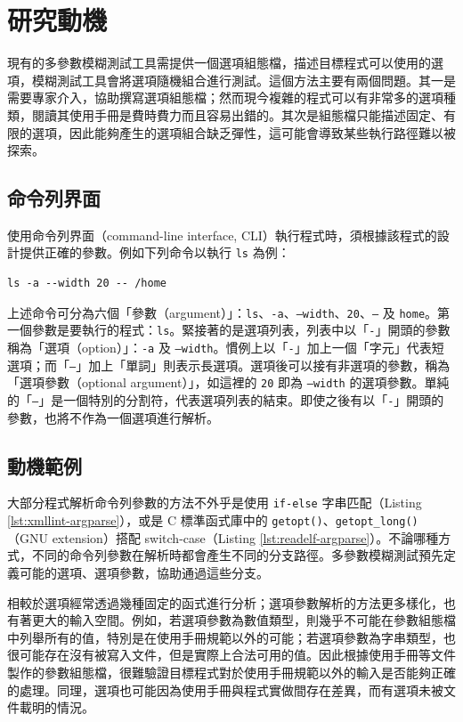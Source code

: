 \section{研究動機}

現有的多參數模糊測試工具需提供一個選項組態檔，描述目標程式可以使用的選項，模糊測試工具會將選項隨機組合進行測試。這個方法主要有兩個問題。其一是需要專家介入，協助撰寫選項組態檔；然而現今複雜的程式可以有非常多的選項種類，閱讀其使用手冊是費時費力而且容易出錯的。其次是組態檔只能描述固定、有限的選項，因此能夠產生的選項組合缺乏彈性，這可能會導致某些執行路徑難以被探索。

\subsection{命令列界面}

使用命令列界面（command-line interface, CLI）執行程式時，須根據該程式的設計提供正確的參數。例如下列命令以執行 \texttt{ls} 為例：

\begin{lstlisting}[numbers=none]
ls -a --width 20 -- /home
\end{lstlisting}

上述命令可分為六個「參數（argument）」：\texttt{ls}、\texttt{-a}、\texttt{--width}、\texttt{20}、\texttt{--} 及 \texttt{home}。第一個參數是要執行的程式：\texttt{ls}。緊接著的是選項列表，列表中以「\texttt{-}」開頭的參數稱為「選項（option）」：\texttt{-a} 及 \texttt{--width}。慣例上以「\texttt{-}」加上一個「字元」代表短選項；而「\texttt{--}」加上「單詞」則表示長選項。選項後可以接有非選項的參數，稱為「選項參數（optional argument）」，如這裡的 \texttt{20} 即為 \texttt{--width} 的選項參數。單純的「\texttt{--}」是一個特別的分割符，代表選項列表的結束。即使之後有以「\texttt{-}」開頭的參數，也將不作為一個選項進行解析。

\subsection{動機範例}

大部分程式解析命令列參數的方法不外乎是使用 \texttt{if-else} 字串匹配（Listing \ref{lst:xmllint-argparse}），或是 C 標準函式庫中的 \texttt{getopt()}、\texttt{getopt\_long()} （GNU extension）搭配 switch-case（Listing \ref{lst:readelf-argparse}）。不論哪種方式，不同的命令列參數在解析時都會產生不同的分支路徑。多參數模糊測試預先定義可能的選項、選項參數，協助通過這些分支。

相較於選項經常透過幾種固定的函式進行分析；選項參數解析的方法更多樣化，也有著更大的輸入空間。例如，若選項參數為數值類型，則幾乎不可能在參數組態檔中列舉所有的值，特別是在使用手冊規範以外的可能；若選項參數為字串類型，也很可能存在沒有被寫入文件，但是實際上合法可用的值。因此根據使用手冊等文件製作的參數組態檔，很難驗證目標程式對於使用手冊規範以外的輸入是否能夠正確的處理。同理，選項也可能因為使用手冊與程式實做間存在差異，而有選項未被文件載明的情況。

